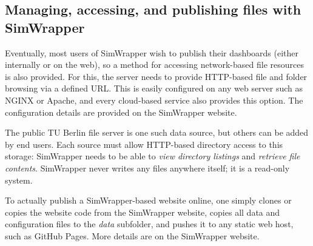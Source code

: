 \documentclass[3p,times,procedia]{elsarticle}
\begin{document}
\subsection{Managing, accessing, and publishing files with SimWrapper}

Eventually, most users of SimWrapper wish to publish their dashboards (either internally or on the web), so a method for accessing network-based file resources is also provided. For this, the server needs to provide HTTP-based file and folder browsing via a defined URL. This is easily configured on any web server such as NGINX or Apache, and every cloud-based service also provides this option. The configuration details are provided on the SimWrapper website.

The public TU Berlin file server is one such data source, but others can be added by end users. Each source must allow HTTP-based directory access to this storage: SimWrapper needs to be able to \emph{view directory listings} and \emph{retrieve file contents}. SimWrapper never writes any files anywhere itself; it is a read-only system.

To actually publish a SimWrapper-based website online, one simply clones or copies the website code from the SimWrapper website, copies all data and configuration files to the \textit{data} subfolder, and pushes it to any static web host, such as GitHub Pages. More details are on the SimWrapper website.




\end{document}
